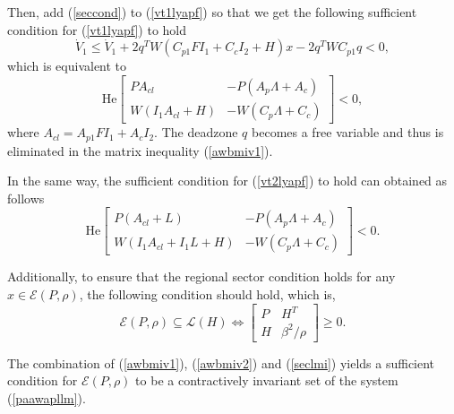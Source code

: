 \documentclass[10pt,final,journal,twoside]{IEEEtran}
\begin{document}
Then, add (\ref{seccond}) to (\ref{vt1lyapf}) so that we get the following sufficient condition for (\ref{vt1lyapf}) to hold
\begin{equation}\label{stbcond}
    \dot{V}_1\leqslant\dot{V}_1+2q^TW\left(C_{p1}FI_1+C_cI_2+H\right)x-2q^TWC_{p1}q<0,
\end{equation}
which is equivalent to
\begin{equation}\label{awbmiv1}
\mathrm{He}\begin{bmatrix}
    PA_{cl}&-P(A_p\Lambda+A_c)\\
    W\left(I_1A_{cl}+H\right)&-W\left(C_p\Lambda+C_c\right)
\end{bmatrix}<0,
\end{equation}
where $A_{cl}=A_{p1}FI_1+A_cI_2$. The deadzone $q$ becomes a free variable and thus is eliminated in the matrix inequality (\ref{awbmiv1}).\par
In the same way, the sufficient condition for (\ref{vt2lyapf}) to hold can obtained as follows
\begin{equation}\label{awbmiv2}
\mathrm{He}\begin{bmatrix}
    P\left(A_{cl}+L\right)&-P(A_p\Lambda+A_c)\\
    W\left(I_1A_{cl}+I_1L+H\right)&-W\left(C_p\Lambda+C_c\right)
\end{bmatrix}<0.
\end{equation}\par
Additionally, to ensure that the regional sector condition holds for any $x\in\mathcal{E}(P,\rho)$, the following condition should hold, which is,
\begin{equation}\label{seclmi}
\!\!\!\!\!\!\!\!\mathcal{E}(P,\rho)\subseteq\mathcal{L}(H)\Longleftrightarrow
\begin{bmatrix}
    P&H^T\\H&\beta^2/\rho
\end{bmatrix}\geqslant0.
\end{equation}\par
The combination of (\ref{awbmiv1}), (\ref{awbmiv2}) and (\ref{seclmi}) yields a sufficient condition for $\mathcal{E}(P,\rho)$ to be a contractively invariant
set of the system (\ref{paawapllm}).\par
\end{document}
